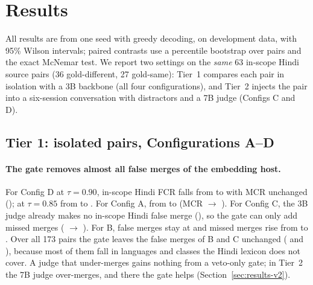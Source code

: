 \section{Results}
\label{sec:results}

All results are from one seed with greedy decoding, on development data, with 95\% Wilson intervals; paired contrasts use a percentile
bootstrap over pairs and the exact McNemar test. We report two settings on the \emph{same} 63 in-scope Hindi source pairs (36
gold-different, 27 gold-same): Tier~1 compares each pair in isolation with a 3B backbone (all four configurations), and Tier~2 injects the
pair into a six-session conversation with distractors and a 7B judge (Configs C and D).

\subsection{Tier 1: isolated pairs, Configurations A--D}

\begin{table}[t]\centering\small
\resizebox{\linewidth}{!}{}
\caption{Tier~1 (Qwen2.5-3B, seed 0; labels LLM-annotated, provisional). ``In-scope hi'': kinship, honorific register and name-variant
pairs in Hindi, the source pairs of Tier~2. ``All'': all 173 pairs (Hindi, Korean, Turkish, German), including classes the lexicon does
not cover. The LLM fallback equals the plain gate here because the Hindi lexicon flags no class as ambiguous on these items.}
\label{tab:tier1}
\end{table}

\paragraph{The gate removes almost all false merges of the embedding host.} For Config D at $\tau=0.90$, in-scope Hindi FCR falls from
\TOneDNinetyOffHiFCR{} to \TOneDNinetyLexHiFCR{} with MCR unchanged (\TOneDNinetyOffHiMCR{}); at $\tau=0.85$ from \TOneDEightyFiveOffHiFCR{}
to \TOneDEightyFiveLexHiFCR{}. For Config A, from \TOneAOffHiFCR{} to \TOneALexHiFCR{} (MCR \TOneAOffHiMCR{} $\to$ \TOneALexHiMCR{}).
For Config C, the 3B judge already makes no in-scope Hindi false merge (\TOneCOffHiFCR{}), so the gate can only add missed merges
(\TOneCOffHiMCR{} $\to$ \TOneCLexHiMCR{}). For B, false merges stay at \TOneBOffHiFCR{} and missed merges rise from \TOneBOffHiMCR{}
to \TOneBLexHiMCR{}. Over all 173 pairs the gate leaves the false merges of B and C unchanged (\TOneBOffAllFCR{} and
\TOneCOffAllFCR{}), because most of them fall in languages and classes the Hindi lexicon does not cover. A judge that under-merges
gains nothing from a veto-only gate; in Tier~2 the 7B judge over-merges, and there the gate helps (Section~\ref{sec:results-v2}).


